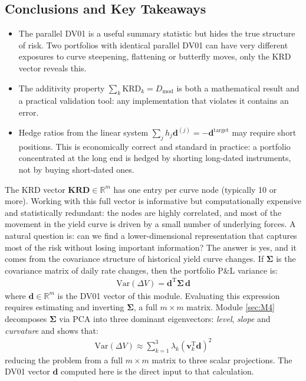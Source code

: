 \documentclass{article}
\theoremstyle{definition}  %
\theoremstyle{plain}  %
\numberwithin{definition}{section}
\numberwithin{proposition}{section}
\numberwithin{theorem}{section}
\numberwithin{equation}{section}
\begin{document}
\subsection{Conclusions and Key Takeaways}

\begin{itemize}
    \item The parallel DV01 is a useful summary 
    statistic but hides the true structure of risk. Two portfolios with identical parallel DV01 can have very different exposures to curve steepening, flattening or butterfly moves, only the KRD vector reveals this.

    \item The additivity property $\sum_{k} \text{KRD}_k = D_{\text{mod}}$ is both a mathematical result and a practical validation tool: any implementation that violates it contains an error.

    \item Hedge ratios from the linear system $\sum_j h_j \mathbf{d}^{(j)} = -\mathbf{d}^{\text{target}}$ may require short positions. This is economically correct and standard in practice: a portfolio concentrated at the long end is hedged by shorting long-dated instruments, not by buying short-dated ones.
\end{itemize}

The KRD vector $\mathbf{KRD} \in \mathbb{R}^m$ has one entry per curve node (typically 10 or more). Working with this full vector is informative but computationally expensive and statistically redundant: the nodes are highly correlated, and most of the movement in the yield curve is driven by a small number of underlying forces. A natural question is: can we find a lower-dimensional representation that captures most of the risk without losing important information? The answer is yes, and it comes from the covariance structure of historical yield curve changes. If $\mathbf{\Sigma}$ is the covariance matrix of daily rate changes, then the portfolio P\&L variance is:
\begin{align*}
    \text{Var}(\Delta V) = \mathbf{d}^{\mathrm{T}} 
    \boldsymbol{\Sigma} \, \mathbf{d}
\end{align*}
where $\mathbf{d} \in \mathbb{R}^m$ is the DV01 vector of this module. Evaluating this expression requires estimating and inverting $\mathbf{\Sigma}$, a full $m \times m$ matrix. Module \ref{sec:M4} decomposes $\mathbf{\Sigma}$ via PCA into three dominant eigenvectors: \textit{level}, \textit{slope} and \textit{curvature} and shows that:
\begin{align*}
    \text{Var}(\Delta V) \approx \sum_{k=1}^{3} 
    \lambda_k \left(\mathbf{v}_k^{\mathrm{T}} 
    \mathbf{d}\right)^2
\end{align*}
reducing the problem from a full $m \times m$ matrix to three scalar projections. The DV01 vector $\mathbf{d}$ computed here is the direct input to that calculation.
\end{document}

